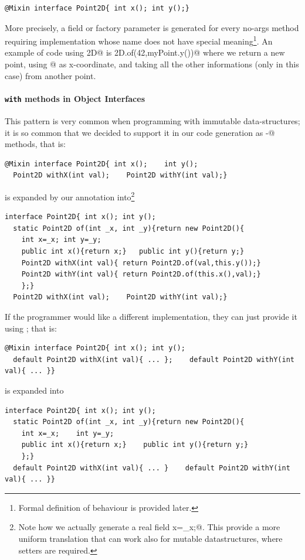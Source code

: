 \begin{lstlisting}
@Mixin interface Point2D{ int x(); int y();}
\end{lstlisting}

More precisely, a field or factory parameter is generated for every
no-args method requiring implementation whose name does not have
special meaning\footnote{Formal definition of \mixin behaviour is
  provided later.}.  An example of code using \Q@Point2D@ is
\Q@Point2D.of(42,myPoint.y())@ where we return a new point, using
@ as x-coordinate, and taking all the other informations (only
\Q@y@ in this case) from another point.  

\paragraph{\texttt{with} methods in Object Interfaces}
This pattern is very common
when programming with immutable data-structures; it is so common that
we decided to support it in our code generation as \Q@with-@ methods,
that is:
\begin{lstlisting}
@Mixin interface Point2D{ int x();    int y();
  Point2D withX(int val);    Point2D withY(int val);}
\end{lstlisting}
is expanded by our annotation into\footnote{
Note how we actually generate a real field \Q@int x=_x;@.
This provide a more uniform translation that can work also for mutable datastructures, where setters are required.
}

\begin{lstlisting}
interface Point2D{ int x(); int y();
  static Point2D of(int _x, int _y){return new Point2D(){
    int x=_x; int y=_y;
    public int x(){return x;}   public int y(){return y;}
    Point2D withX(int val){ return Point2D.of(val,this.y());}    
    Point2D withY(int val){ return Point2D.of(this.x(),val);}  
    };}
  Point2D withX(int val);    Point2D withY(int val);}
\end{lstlisting}
If the programmer would like a different implementation, they can just provide it using \Q@default@; that is:
\begin{lstlisting}
@Mixin interface Point2D{ int x(); int y();
  default Point2D withX(int val){ ... };    default Point2D withY(int val){ ... }}
\end{lstlisting}
is expanded into
\begin{lstlisting}
interface Point2D{ int x(); int y();
  static Point2D of(int _x, int _y){return new Point2D(){
    int x=_x;    int y=_y;
    public int x(){return x;}    public int y(){return y;}
    };}
  default Point2D withX(int val){ ... }    default Point2D withY(int val){ ... }}
\end{lstlisting}

